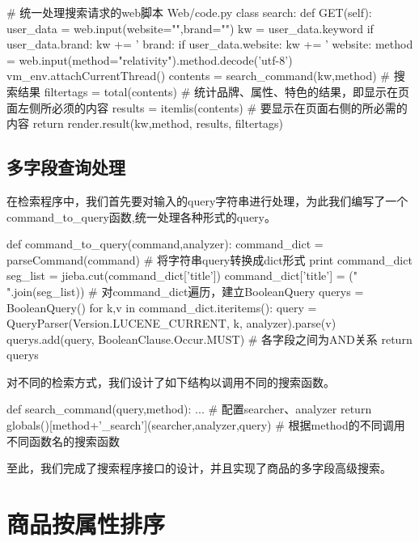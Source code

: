 \begin{python}
# 统一处理搜索请求的web脚本 Web/code.py
class search:
    def GET(self):
        user_data = web.input(website="",brand="")
        kw = user_data.keyword
        if user_data.brand:
            kw += ' brand:%
        if user_data.website:
            kw += ' website:%
        method = web.input(method="relativity").method.decode('utf-8')
        vm_env.attachCurrentThread()
        contents = search_command(kw,method)     # 搜索结果
        filtertags = total(contents)           # 统计品牌、属性、特色的结果，即显示在页面左侧所必须的内容
        results = itemlis(contents)            # 要显示在页面右侧的所必需的内容
        return render.result(kw,method, results, filtertags)
\end{python}

\subsection{多字段查询处理}

在检索程序中，我们首先要对输入的query字符串进行处理，为此我们编写了一个command\_to\_query函数,统一处理各种形式的query。

\begin{python}
def command_to_query(command,analyzer):
    command_dict = parseCommand(command)          # 将字符串query转换成dict形式
    print command_dict
    seg_list = jieba.cut(command_dict['title'])
    command_dict['title'] = (" ".join(seg_list))  # 对command_dict遍历，建立BooleanQuery
    querys = BooleanQuery()
    for k,v in command_dict.iteritems():
        query = QueryParser(Version.LUCENE_CURRENT, k,
                            analyzer).parse(v)
        querys.add(query, BooleanClause.Occur.MUST)  # 各字段之间为AND关系
    return querys
\end{python}

对不同的检索方式，我们设计了如下结构以调用不同的搜索函数。
\begin{python}
def search_command(query,method):
    ... # 配置searcher、analyzer
    return globals()[method+'_search'](searcher,analyzer,query)
    # 根据method的不同调用不同函数名的搜索函数
\end{python}

至此，我们完成了搜索程序接口的设计，并且实现了商品的多字段高级搜索。

\section{商品按属性排序}

